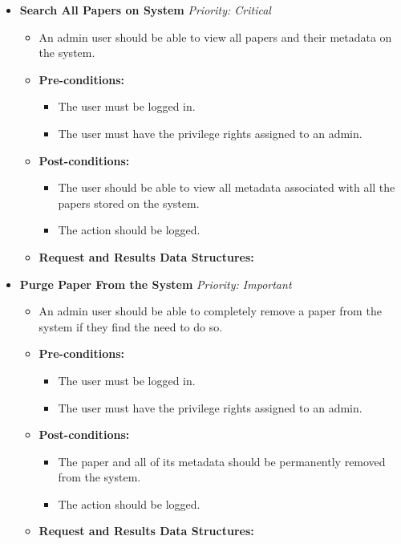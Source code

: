 \documentclass{article}
\begin{document}
				\begin{itemize}
					\item \textbf{Search All Papers on System} \hfill \textit{Priority: Critical}
					\begin{itemize}
						\item An admin user should be able to view all papers and their metadata on the system.
						\item \textbf{Pre-conditions:}
						\begin{itemize}
							\item The user must be logged in.
							\item The user must have the privilege rights assigned to an admin.
						\end{itemize}
						\item \textbf{Post-conditions:}
						\begin{itemize}
							\item The user should be able to view all metadata associated with all the papers stored on the system.
							\item The action should be logged.
						\end{itemize}
						\item \textbf{Request and Results Data Structures:}
					\end{itemize}
					
					\item \textbf{Purge Paper From the System} \hfill \textit{Priority: Important}
					\begin{itemize}
						\item An admin user should be able to completely remove a paper from the system if they find the need to do so.
						\item \textbf{Pre-conditions:}
						\begin{itemize}
							\item The user must be logged in.
							\item The user must have the privilege rights assigned to an admin.
						\end{itemize}
						\item \textbf{Post-conditions:}
						\begin{itemize}
							\item The paper and all of its metadata should be permanently removed from the system.
							\item The action should be logged.
						\end{itemize}
						\item \textbf{Request and Results Data Structures:}
					\end{itemize}
				\end{itemize}
\end{document}

